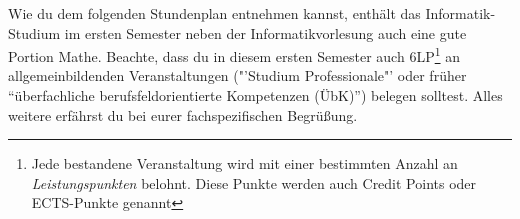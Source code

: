 Wie du dem folgenden Stundenplan entnehmen kannst, enthält das Informatik-Studium im ersten
Semester neben der Informatikvorlesung auch eine gute Portion Mathe. Beachte, dass du
in diesem ersten Semester auch 6LP\footnote{Jede bestandene Veranstaltung wird mit einer bestimmten Anzahl an \emph{Leistungspunkten} belohnt. Diese Punkte werden auch Credit Points oder ECTS-Punkte genannt} an allgemeinbildenden Veranstaltungen ("'Studium Professionale"' oder früher "`überfachliche berufsfeldorientierte Kompetenzen (ÜbK)"') belegen solltest.
Alles weitere erfährst du bei eurer fachspezifischen Begrüßung.

\noindent\makebox[\textwidth][c]{%
	\setlength{\fboxrule}{4pt}
	\fcolorbox{red}{white}{
		\begin{minipage}[t]{
			\textwidth}\textbf{Achtung!} Die Daten für die Vorlesungstermine können sich noch ändern. Schau am besten auf Alma (\url{https://alma.uni-tuebingen.de}), ob die Termine dort geupdatet wurden.
		\end{minipage}}}

